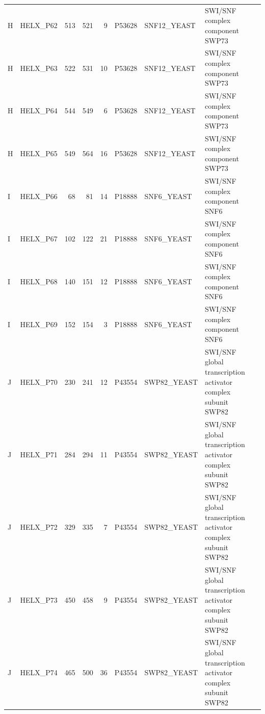 \begin{longtable}{@{}llrrrrllp{5.2cm}@{}}
  H & HELX_P62 & 513 & 521 & 9 & P53628 & SNF12_YEAST & SWI/SNF complex component SWP73 \\
  H & HELX_P63 & 522 & 531 & 10 & P53628 & SNF12_YEAST & SWI/SNF complex component SWP73 \\
  H & HELX_P64 & 544 & 549 & 6 & P53628 & SNF12_YEAST & SWI/SNF complex component SWP73 \\
  H & HELX_P65 & 549 & 564 & 16 & P53628 & SNF12_YEAST & SWI/SNF complex component SWP73 \\
  I & HELX_P66 & 68 & 81 & 14 & P18888 & SNF6_YEAST & SWI/SNF complex component SNF6 \\
  I & HELX_P67 & 102 & 122 & 21 & P18888 & SNF6_YEAST & SWI/SNF complex component SNF6 \\
  I & HELX_P68 & 140 & 151 & 12 & P18888 & SNF6_YEAST & SWI/SNF complex component SNF6 \\
  I & HELX_P69 & 152 & 154 & 3 & P18888 & SNF6_YEAST & SWI/SNF complex component SNF6 \\
  J & HELX_P70 & 230 & 241 & 12 & P43554 & SWP82_YEAST & SWI/SNF global transcription activator complex subunit SWP82 \\
  J & HELX_P71 & 284 & 294 & 11 & P43554 & SWP82_YEAST & SWI/SNF global transcription activator complex subunit SWP82 \\
  J & HELX_P72 & 329 & 335 & 7 & P43554 & SWP82_YEAST & SWI/SNF global transcription activator complex subunit SWP82 \\
  J & HELX_P73 & 450 & 458 & 9 & P43554 & SWP82_YEAST & SWI/SNF global transcription activator complex subunit SWP82 \\
  J & HELX_P74 & 465 & 500 & 36 & P43554 & SWP82_YEAST & SWI/SNF global transcription activator complex subunit SWP82 \\
\end{longtable}
